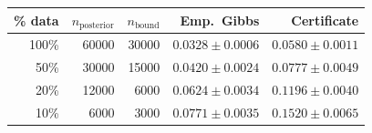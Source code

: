 \begin{tabular}{r r r r r}
\toprule
\% data & $n_{\text{posterior}}$ & $n_{\text{bound}}$ & Emp.\ Gibbs & \textbf{Certificate} \\
\midrule
100\% & 60000 & 30000 & $0.0328\pm0.0006$ & $0.0580\pm0.0011$ \\
50\% & 30000 & 15000 & $0.0420\pm0.0024$ & $0.0777\pm0.0049$ \\
20\% & 12000 & 6000 & $0.0624\pm0.0034$ & $0.1196\pm0.0040$ \\
10\% & 6000 & 3000 & $0.0771\pm0.0035$ & $0.1520\pm0.0065$ \\
\bottomrule
\end{tabular}
